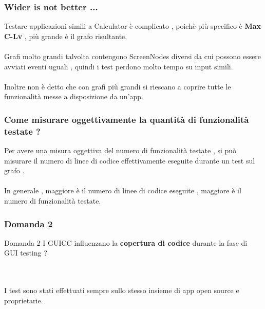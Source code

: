 \documentclass[12pt]{beamer}
\begin{document}

\begin{frame}
\frametitle{Wider is not better ...}
Testare applicazioni simili a Calculator  \`e complicato , poich\`e pi\`u specifico \`e \textbf{Max C-Lv} , pi\`u grande \`e il grafo risultante.
\\~\\

Grafi molto grandi talvolta contengono ScreenNodes diversi da cui possono essere avviati eventi uguali , quindi i test perdono molto tempo su input simili.
\\~\\

Inoltre non \`e detto che con grafi pi\`u grandi si riescano a coprire tutte le funzionalit\`a messe a disposizione da un'app. 
\end{frame}


\begin{frame}
\frametitle{Come misurare oggettivamente la quantit\`a di funzionalit\`a testate ?}
Per avere una misura oggettiva del numero di funzionalit\`a testate , si pu\`o misurare il numero di linee di codice effettivamente eseguite durante un test sul grafo .
\\~\\

In generale , maggiore \`e il numero di linee di codice eseguite , maggiore \`e il numero di funzionalit\`a testate.
\end{frame}


\begin{frame}
\frametitle{Domanda 2}
\begin{block}{Domanda 2}
    I GUICC influenzano la \textbf{copertura di codice} durante la fase di GUI testing  ? 
\end{block}
\\~\\
I test sono stati effettuati sempre sullo stesso insieme di app open source e proprietarie.

\end{frame}
\end{document}
